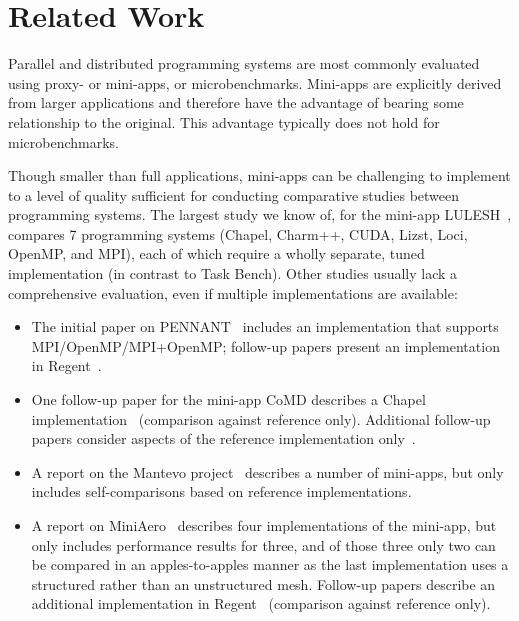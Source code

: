\section{Related Work}
\label{sec:related-work}

Parallel and distributed programming systems are most
commonly evaluated using proxy- or mini-apps, or
micro\-benchmarks. Mini-apps are explicitly derived from larger
applications and therefore have the advantage of bearing some
relationship to the original. This advantage typically does not hold
for microbenchmarks.

Though smaller than full applications, mini-apps can be challenging to
implement to a level of quality sufficient for conducting comparative
studies between programming systems. The largest study we know of,
for the mini-app LULESH~\cite{LULESH13}, compares 7 programming
systems (Chapel, Charm++, CUDA, Lizst, Loci, OpenMP, and MPI), each of
which require a wholly separate, tuned implementation (in contrast to
Task Bench). Other
studies usually lack a comprehensive evaluation, even if multiple
implementations are available:

\begin{itemize}

\item
The initial paper on PENNANT~\cite{PENNANT} includes an
implementation that supports MPI/OpenMP/MPI+OpenMP; follow-up papers present an implementation in
Regent~\cite{Regent15, ControlReplication17, LegionTracing18}.

\item
One follow-up paper for the mini-app CoMD describes a Chapel
implementation~\cite{CoMDChapel16} (comparison against reference
only). Additional follow-up papers consider aspects of the reference
implementation only~\cite{CoMDLoadImbalance17,
  CoMDThreadedModels14}.

\item
A report on the Mantevo project~\cite{Mantevo09} describes a number of
mini-apps, but only includes self-comparisons based on reference
implementations.

\item
A report on MiniAero~\cite{SandiaReportManyTaskRuntimes15} describes
four implementations of the mini-app, but only includes performance
results for three, and of those three only two can be compared in an
apples-to-apples manner as the last implementation uses a structured
rather than an unstructured mesh. Follow-up papers describe an
additional implementation in Regent~\cite{Regent15,
  ControlReplication17, LegionTracing18} (comparison against reference
only).

\end{itemize}


